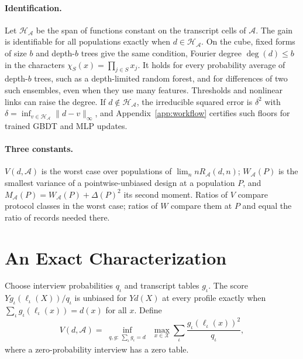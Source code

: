 \documentclass{article}
\newcommand{\X}{\mathcal X}
\newcommand{\A}{\mathcal A}
\newcommand{\Hh}{\mathcal H}
\begin{document}
\paragraph{Identification.}
Let $\Hh_\A$ be the span of functions constant on the transcript cells of $\A$. The gain is identifiable for all populations exactly when $d\in\Hh_\A$. On the cube, fixed forms of size $b$ and depth-$b$ trees give the same condition, Fourier degree $\deg(d)\le b$ in the characters $\chi_S(x)=\prod_{j\in S}x_j$. It holds for every probability average of depth-$b$ trees, such as a depth-limited random forest, and for differences of two such ensembles, even when they use many features. Thresholds and nonlinear links can raise the degree. If $d\notin\Hh_\A$, the irreducible squared error is $\delta^2$ with $\delta=\inf_{v\in\Hh_\A}\|d-v\|_\infty$, and Appendix~\ref{app:workflow} certifies such floors for trained GBDT and MLP updates.

\paragraph{Three constants.}
$V(d,\A)$ is the worst case over populations of $\lim_n nR_\A(d,n)$; $W_\A(P)$ is the smallest variance of a pointwise-unbiased design at a population $P$, and $M_\A(P)=W_\A(P)+\Delta(P)^2$ its second moment. Ratios of $V$ compare protocol classes in the worst case; ratios of $W$ compare them at $P$ and equal the ratio of records needed there.

\section{An Exact Characterization}\label{sec:general}
Choose interview probabilities $q_\iota$ and transcript tables $g_\iota$. The score $Yg_\iota(\ell_\iota(X))/q_\iota$ is unbiased for $Yd(X)$ at every profile exactly when $\sum_\iota g_\iota(\ell_\iota(x))=d(x)$ for all $x$. Define
\begin{equation}
 V(d,\A)=\inf_{\substack{q,g:\ \sum_\iota g_\iota=d}}\ \max_{x\in\X}
             \sum_\iota\frac{g_\iota(\ell_\iota(x))^2}{q_\iota},\label{eq:unbiasedprogram}
\end{equation}
where a zero-probability interview has a zero table.
\end{document}
